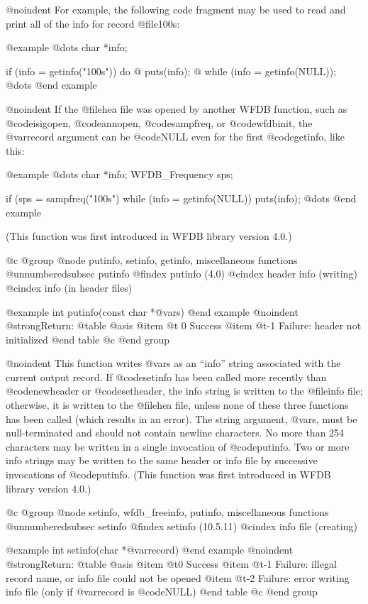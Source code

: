 {{{{{{{{{@noindent
For example, the following code fragment may be used to read and print all of
the info for record @file{100s}:

@example
@dots{}
char *info;

if (info = getinfo("100s"))
    do @{
        puts(info);
    @} while (info = getinfo(NULL));
@dots{}
@end example

@noindent
If the @file{hea} file was opened by another WFDB function, such as
@code{isigopen}, @code{annopen}, @code{sampfreq}, or @code{wfdbinit},
the @var{record} argument can be @code{NULL} even for the first @code{getinfo},
like this:

@example
@dots{}
char *info;
WFDB_Frequency sps;

if (sps = sampfreq("100s")
    while (info = getinfo(NULL))
        puts(info);
@dots{}
@end example

(This function was first introduced in WFDB library version 4.0.)

@c @group
@node     putinfo, setinfo, getinfo, miscellaneous functions
@unnumberedsubsec putinfo
@findex putinfo (4.0)
@cindex header info (writing)
@cindex info (in header files)

@example
int putinfo(const char *@var{s})
@end example
@noindent
@strong{Return:}
@table @asis
@item @t{ 0}
Success
@item @t{-1}
Failure: header not initialized
@end table
@c @end group

@noindent
This function writes @var{s} as an ``info'' string associated with the current
output record.  If @code{setinfo} has been called more recently than
@code{newheader} or @code{setheader}, the info string is written to the
@file{info} file; otherwise, it is written to the @file{hea} file, unless none
of these three functions has been called (which results in an error).  The
string argument, @var{s}, must be null-terminated and should not contain
newline characters.  No more than 254 characters may be written in a single
invocation of @code{putinfo}.  Two or more info strings may be written to the
same header or info file by successive invocations of @code{putinfo}.
(This function was first introduced in WFDB library version 4.0.)

@c @group
@node     setinfo, wfdb_freeinfo, putinfo, miscellaneous functions
@unnumberedsubsec setinfo
@findex setinfo (10.5.11)
@cindex info file (creating)

@example
int setinfo(char *@var{record})
@end example
@noindent
@strong{Return:}
@table @asis
@item @t{0}
Success
@item @t{-1}
Failure: illegal record name, or info file could not be opened
@item @t{-2}
Failure: error writing info file (only if @var{record} is @code{NULL})
@end table
@c @end group

}}}}}}}}}
